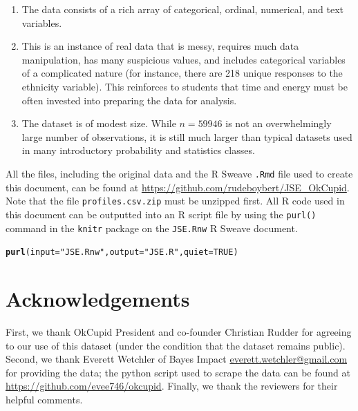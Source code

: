 \documentclass{article}\usepackage[]{graphicx}\usepackage[]{color}
\makeatletter
\newcommand{\hlnum}[1]{\textcolor[rgb]{0.686,0.059,0.569}{#1}}%
\newcommand{\hlstr}[1]{\textcolor[rgb]{0.192,0.494,0.8}{#1}}%
\newcommand{\hlstd}[1]{\textcolor[rgb]{0.345,0.345,0.345}{#1}}%
\newcommand{\hlkwc}[1]{\textcolor[rgb]{0.333,0.667,0.333}{#1}}%
\newcommand{\hlkwd}[1]{\textcolor[rgb]{0.737,0.353,0.396}{\textbf{#1}}}%
\newenvironment{kframe}{%
 \def\at@end@of@kframe{}%
 \ifinner\ifhmode%
  \def\at@end@of@kframe{\end{minipage}}%
  \begin{minipage}{\columnwidth}%
 \fi\fi%
 \def\FrameCommand##1{\hskip\@totalleftmargin \hskip-\fboxsep
 \colorbox{shadecolor}{##1}\hskip-\fboxsep
     \hskip-\linewidth \hskip-\@totalleftmargin \hskip\columnwidth}%
 \MakeFramed {\advance\hsize-\width
   \@totalleftmargin\z@ \linewidth\hsize
   \@setminipage}}%
 {\par\unskip\endMakeFramed%
 \at@end@of@kframe}
\newenvironment{knitrout}{}{} %
\makeatother
\begin{document}
\begin{enumerate}
\item The data consists of a rich array of categorical, ordinal, numerical, and text variables.
\item This is an instance of real data that is messy, requires much data manipulation, has many suspicious values, and includes categorical variables of a complicated nature (for instance, there are 218 unique responses to the ethnicity variable).  This reinforces to students that time and energy must be often invested into preparing the data for analysis.
\item The dataset is of modest size.  While $n = 59946$ is not an overwhelmingly large number of observations, it is still much larger than typical datasets used in many introductory probability and statistics classes.
\end{enumerate}

All the files, including the original data and the R Sweave \verb#.Rmd# file used to create this document, can be found at \url{https://github.com/rudeboybert/JSE_OkCupid}.  Note that the file \verb#profiles.csv.zip# must be unzipped first.  All R code used in this document can be outputted into an R script file by using the \verb#purl()# command in the \verb#knitr# package on the \verb#JSE.Rnw# R Sweave document.
\begin{knitrout}
\color{fgcolor}\begin{kframe}
\begin{alltt}
\hlkwd{purl}\hlstd{(}\hlkwc{input}\hlstd{=}\hlstr{"JSE.Rnw"}\hlstd{,} \hlkwc{output}\hlstd{=}\hlstr{"JSE.R"}\hlstd{,} \hlkwc{quiet}\hlstd{=}\hlnum{TRUE}\hlstd{)}
\end{alltt}
\end{kframe}
\end{knitrout}










%
\section{Acknowledgements}\label{ack}
%
First, we thank OkCupid President and co-founder Christian Rudder for agreeing to our use of this dataset (under the condition that the dataset remains public).  Second, we thank Everett Wetchler of Bayes Impact \url{everett.wetchler@gmail.com} for providing the data; the python script used to scrape the data can be found at \url{https://github.com/evee746/okcupid}.  Finally, we thank the reviewers for their helpful comments.
\end{document}
